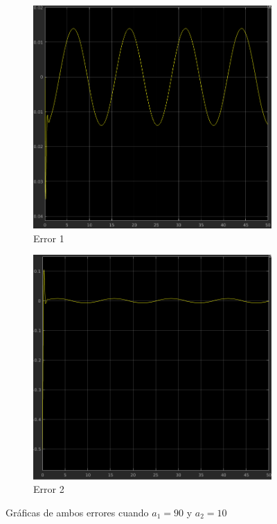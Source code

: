 \documentclass[12pt, letterpaper]{article}
\begin{document}
\begin{figure}[H]
	\centering
	\begin{subfigure}[b]{0.49\linewidth}
		\includegraphics[width=\linewidth]{e1a90.png}
		\caption{Error 1}
	\end{subfigure}
	\begin{subfigure}[b]{0.49\linewidth}
		\includegraphics[width=\linewidth]{e2a90.png}
		\caption{Error 2}
	\end{subfigure}
	\caption{Gráficas de ambos errores cuando $a_1 = 90$ y $a_2 = 10$}
\end{figure}
\end{document}
